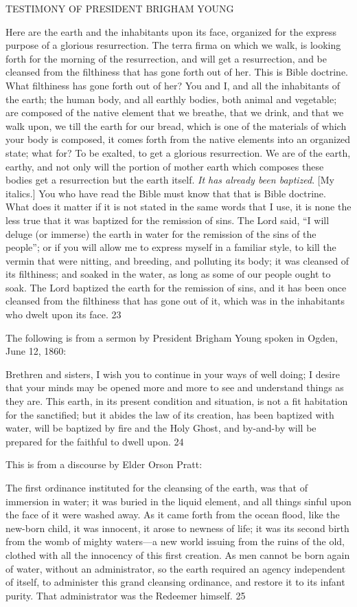TESTIMONY OF PRESIDENT BRIGHAM YOUNG

Here are the earth and the inhabitants upon its face, organized for the express purpose of a
glorious resurrection. The terra firma on which we walk, is looking forth for the morning of
the resurrection, and will get a resurrection, and be cleansed from the filthiness that has gone
forth out of her. This is Bible doctrine. What filthiness has gone forth out of her? You and I,
and all the inhabitants of the earth; the human body, and all earthly bodies, both animal and
vegetable; are composed of the native element that we breathe, that we drink, and that we
walk upon, we till the earth for our bread, which is one of the materials of which your body is
composed, it comes forth from the native elements into an organized state; what for? To be
exalted, to get a glorious resurrection. We are of the earth, earthy, and not only will the
portion of mother earth which composes these bodies get a resurrection but the earth itself. \textit{It
has already been baptized}. [My italics.] You who have read the Bible must know that that is
Bible doctrine. What does it matter if it is not stated in the same words that I use, it is none
the less true that it was baptized for the remission of sins. The Lord said, ``I will deluge (or
immerse) the earth in water for the remission of the sins of the people''; or if you will allow
me to express myself in a familiar style, to kill the vermin that were nitting, and breeding,
and polluting its body; it was cleansed of its filthiness; and soaked in the water, as long as
some of our people ought to soak. The Lord baptized the earth for the remission of sins, and
it has been once cleansed from the filthiness that has gone out of it, which was in the
inhabitants who dwelt upon its face. 23

The following is from a sermon by President Brigham Young spoken in Ogden, June 12,
1860:

Brethren and sisters, I wish you to continue in your ways of well doing; I desire that your
minds may be opened more and more to see and understand things as they are. This earth, in
its present condition and situation, is not a fit habitation for the sanctified; but it abides the
law of its creation, has been baptized with water, will be baptized by fire and the Holy Ghost,
and by-and-by will be prepared for the faithful to dwell upon. 24

This is from a discourse by Elder Orson Pratt:

The first ordinance instituted for the cleansing of the earth, was that of immersion in water; it
was buried in the liquid element, and all things sinful upon the face of it were washed away.
As it came forth from the ocean flood, like the new-born child, it was innocent, it arose to
newness of life; it was its second birth from the womb of mighty waters—a new world
issuing from the ruins of the old, clothed with all the innocency of this first creation. As men
cannot be born again of water, without an administrator, so the earth required an agency
independent of itself, to administer this grand cleansing ordinance, and restore it to its infant
purity. That administrator was the Redeemer himself. 25

